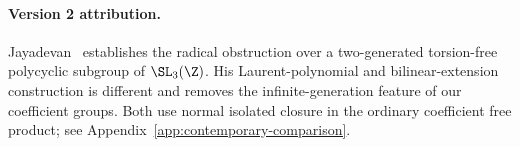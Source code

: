 
\paragraph{Version 2 attribution.}
Jayadevan~\cite{jayadevan-14-22} establishes the radical obstruction
over a two-generated torsion-free polycyclic subgroup of \(\SL_3(\Z)\).
His Laurent-polynomial and bilinear-extension construction is different
and removes the infinite-generation feature of our coefficient groups.
Both use normal isolated closure in the ordinary coefficient free product;
see Appendix~\ref{app:contemporary-comparison}.
